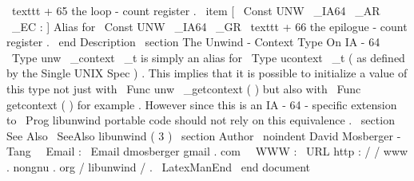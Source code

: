 \
texttt
{
+
65
}
the
loop
-
count
register
.
\
item
[
\
Const
{
UNW
\
_IA64
\
_AR
\
_EC
}
:
]
Alias
for
\
Const
{
UNW
\
_IA64
\
_GR
}
\
texttt
{
+
66
}
the
epilogue
-
count
register
.
\
end
{
Description
}
\
section
{
The
Unwind
-
Context
Type
}
On
IA
-
64
\
Type
{
unw
\
_context
\
_t
}
is
simply
an
alias
for
\
Type
{
ucontext
\
_t
}
(
as
defined
by
the
Single
UNIX
Spec
)
.
This
implies
that
it
is
possible
to
initialize
a
value
of
this
type
not
just
with
\
Func
{
unw
\
_getcontext
}
(
)
but
also
with
\
Func
{
getcontext
}
(
)
for
example
.
However
since
this
is
an
IA
-
64
-
specific
extension
to
\
Prog
{
libunwind
}
portable
code
should
not
rely
on
this
equivalence
.
\
section
{
See
Also
}
\
SeeAlso
{
libunwind
(
3
)
}
\
section
{
Author
}
\
noindent
David
Mosberger
-
Tang
\
\
Email
:
\
Email
{
dmosberger
gmail
.
com
}
\
\
WWW
:
\
URL
{
http
:
/
/
www
.
nongnu
.
org
/
libunwind
/
}
.
\
LatexManEnd
\
end
{
document
}
